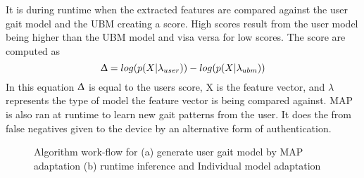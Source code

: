 \documentclass{sig-alternate}
\begin{document}
	It is during runtime when the extracted features are compared against the user gait model and the UBM creating a score. High scores result from the user model being higher than the UBM model and visa versa for low scores. The score are computed as \begin{equation}
	\Updelta = log(p(X|\lambda_{user})) - log(p(X|\lambda_{ubm}))
	\end{equation}
In this equation \begin{math} \Updelta \end{math} is equal to the users score, X is the feature vector, and \begin{math} \lambda \end{math} represents the type of model the feature vector is being compared against. MAP is also ran at runtime to learn new gait patterns from the user. It does the from false negatives given to the device by an alternative form of authentication. 

\begin{figure}
\centering
{}
\caption{Algorithm work-flow for (a) generate user gait model by MAP adaptation (b) runtime inference and Individual model adaptation}
\label{fig:TD2}
\end{figure}


\end{document}

